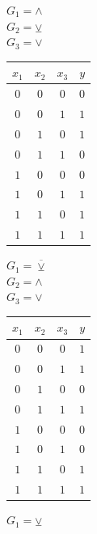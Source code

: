 \begin{table}[h!]
    \centering
    \begin{minipage}{.33\textwidth}
        $G_1 = \land$\\
        $G_2 = \veebar$\\
        $G_3 = \lor$
        \vfill
        \begin{tabular}{|c|c|c|c|} 
            \hline
            $x_1$ & $x_2$ & $x_3$ & $y$\\
            \hline\hline
            $0$ & $0$ & $0$ & $0$\\
            $0$ & $0$ & $1$ & $1$\\
            $0$ & $1$ & $0$ & $1$\\
            $0$ & $1$ & $1$ & $0$\\
            $1$ & $0$ & $0$ & $0$\\
            $1$ & $0$ & $1$ & $1$\\
            $1$ & $1$ & $0$ & $1$\\
            $1$ & $1$ & $1$ & $1$\\
            \hline
        \end{tabular}
    \end{minipage}
    \hfill
    \begin{minipage}{.32\textwidth}
        $G_1 = \overline{\veebar}$\\
        $G_2 = \land$\\
        $G_3 = \lor$
        \vfill
        \begin{tabular}{|c|c|c|c|} 
            \hline
            $x_1$ & $x_2$ & $x_3$ & $y$\\
            \hline\hline
            $0$ & $0$ & $0$ & $1$\\
            $0$ & $0$ & $1$ & $1$\\
            $0$ & $1$ & $0$ & $0$\\
            $0$ & $1$ & $1$ & $1$\\
            $1$ & $0$ & $0$ & $0$\\
            $1$ & $0$ & $1$ & $0$\\
            $1$ & $1$ & $0$ & $1$\\
            $1$ & $1$ & $1$ & $1$\\
            \hline
        \end{tabular}
    \end{minipage}
    \hfill
    \begin{minipage}{.33\textwidth}
        $G_1 = \veebar$\\

\end{minipage}
\end{table}
